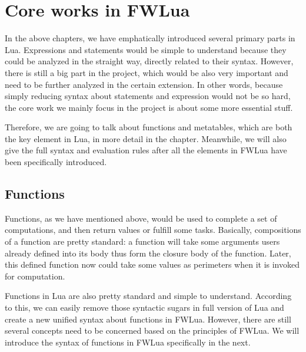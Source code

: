 \documentclass{article}
\begin{document}
\section{Core works in FWLua}
In the above chapters, we have emphatically introduced several primary parts in Lua. Expressions and statements would be simple to understand because they could be analyzed in the straight way, directly related to their syntax. However, there is still a big part in the project, which would be also very important and need to be further analyzed in the certain extension. In other words, because simply reducing syntax about statements and expression would not be so hard, the core work we mainly focus in the project is about some more essential stuff.

Therefore, we are going to talk about functions and metatables, which are both the key element in Lua, in more detail in the chapter. Meanwhile, we will also give the full syntax and evaluation rules after all the elements in FWLua have been specifically introduced.


\subsection{Functions}
Functions, as we have mentioned above, would be used to complete a set of computations, and then return values or fulfill some tasks. Basically, compositions of a function are pretty standard: a function will take some arguments users already defined into its body thus form the closure body of the function. Later, this defined function now could take some values as perimeters when it is invoked for computation.

Functions in Lua are also pretty standard and simple to understand. According to this, we can easily remove those syntactic sugars in full version of Lua and create a new unified syntax about functions in FWLua. However, there are still several concepts need to be concerned based on the principles of FWLua. We will introduce the syntax of functions in FWLua specifically in the next.
\end{document}
